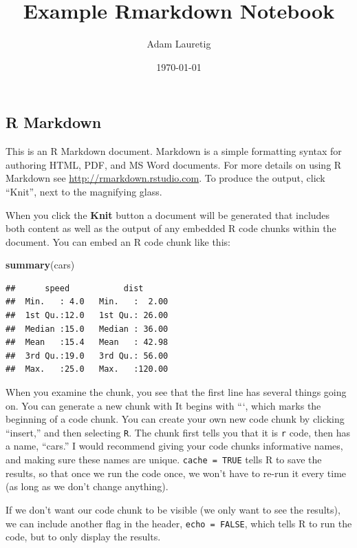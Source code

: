 \documentclass[]{article}
\title{Example Rmarkdown Notebook}
\author{Adam Lauretig}
\date{\today}
\newenvironment{Shaded}{\begin{snugshade}}{\end{snugshade}}
\newcommand{\KeywordTok}[1]{\textcolor[rgb]{0.13,0.29,0.53}{\textbf{{#1}}}}
\newcommand{\NormalTok}[1]{{#1}}
\begin{document}
\maketitle

\subsection{R Markdown}\label{r-markdown}

This is an R Markdown document. Markdown is a simple formatting syntax
for authoring HTML, PDF, and MS Word documents. For more details on
using R Markdown see \url{http://rmarkdown.rstudio.com}. To produce the
output, click ``Knit'', next to the magnifying glass.

When you click the \textbf{Knit} button a document will be generated
that includes both content as well as the output of any embedded R code
chunks within the document. You can embed an R code chunk like this:

\begin{Shaded}
\begin{Highlighting}[]
\KeywordTok{summary}\NormalTok{(cars)}
\end{Highlighting}
\end{Shaded}

\begin{verbatim}
##      speed           dist       
##  Min.   : 4.0   Min.   :  2.00  
##  1st Qu.:12.0   1st Qu.: 26.00  
##  Median :15.0   Median : 36.00  
##  Mean   :15.4   Mean   : 42.98  
##  3rd Qu.:19.0   3rd Qu.: 56.00  
##  Max.   :25.0   Max.   :120.00
\end{verbatim}

When you examine the chunk, you see that the first line has several
things going on. You can generate a new chunk with It begins with ```,
which marks the beginning of a code chunk. You can create your own new
code chunk by clicking ``insert,'' and then selecting \texttt{R}. The
chunk first tells you that it is \texttt{r} code, then has a name,
``cars.'' I would recommend giving your code chunks informative names,
and making sure these names are unique. \texttt{cache\ =\ TRUE} tells R
to save the results, so that once we run the code once, we won't have to
re-run it every time (as long as we don't change anything).

If we don't want our code chunk to be visible (we only want to see the
results), we can include another flag in the header,
\texttt{echo\ =\ FALSE}, which tells R to run the code, but to only
display the results.
\end{document}
